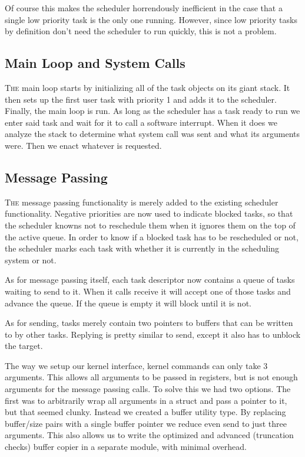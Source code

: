 \documentclass{amsart}
\begin{document}
Of course this makes the scheduler horrendously inefficient in the case that a
single low priority task is the only one running. However, since low priority
tasks by definition don't need the scheduler to run quickly, this is not a
problem.

\subsection*{Main Loop and System Calls}

\textsc{The} main loop starts by initializing all of the task objects on its giant stack.
It then sets up the first user task with priority 1 and adds it to the
scheduler. Finally, the main loop is run. As long as the scheduler has a task
ready to run we enter said task and wait for it to call a software interrupt.
When it does we analyze the stack to determine what system call was sent and
what its arguments were. Then we enact whatever is requested.


\subsection*{Message Passing}

\textsc{The} message passing functionality is merely added to the existing scheduler
functionality. Negative priorities are now used to indicate blocked tasks, so
that the scheduler knowns not to reschedule them when it ignores them on the top
of the active queue. In order to know if a blocked task has to be rescheduled or
not, the scheduler marks each task with whether it is currently in the
scheduling system or not.

As for message passing itself, each task descriptor now contains a queue of
tasks waiting to send to it. When it calls receive it will accept one of those
tasks and advance the queue. If the queue is empty it will block until it is
not.

As for sending, tasks merely contain two pointers to buffers that can be written
to by other tasks. Replying is pretty similar to send, except it also has to
unblock the target.

The way we setup our kernel interface, kernel commands can only take 3
arguments. This allows all arguments to be passed in registers, but is not
enough arguments for the message passing calls. To solve this we had two
options. The first was to arbitrarily wrap all arguments in a struct and pass a
pointer to it, but that seemed clunky. Instead we created a buffer utility type.
By replacing buffer/size pairs with a single buffer pointer we reduce even send
to just three arguments. This also allows us to write the optimized and advanced
(truncation checks) buffer copier in a separate module, with minimal overhead.
\end{document}
